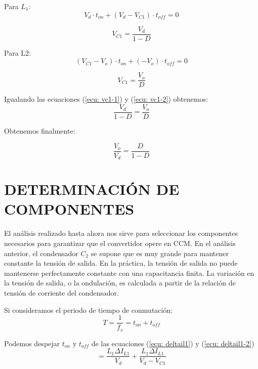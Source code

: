 \documentclass[conference]{IEEEtran}
\begin{document}
Para $L_1$:
\begin{equation}
    V_d\cdot t_{on}+(V_d-V_{C1})\cdot t_{off}=0
\end{equation}

\begin{equation}
    V_{C1}=\frac{V_d}{1-D}
    \label{ecu: vc1-1}
\end{equation}

Para L2:
\begin{equation}
    (V_{C1}-V_o)\cdot t_{on}+(-V_o)\cdot t_{off}=0
\end{equation}

\begin{equation}
    V_{C1}=\frac{V_o}{D}
    \label{ecu: vc1-2}
\end{equation}

Igualando las ecuaciones (\ref{ecu: vc1-1}) y (\ref{ecu: vc1-2}) obtenemos:
\begin{equation}
    \frac{V_d}{1-D}=\frac{V_o}{D}
\end{equation}

Obtenemos finalmente:

\begin{equation}
    \frac{V_o}{V_d}=\frac{D}{1-D}
    \label{ecu: fcn trans}
\end{equation}


\section{DETERMINACIÓN DE COMPONENTES}
El análisis realizado hasta ahora nos sirve para seleccionar los componentes necesarios para garantizar que el convertidor opere en CCM. En el análisis anterior, el condensador $C_2$ se supone que es muy grande para mantener constante la tensión de salida. En la práctica, la tensión de salida no puede mantenerse perfectamente constante con una capacitancia finita. La variación en la tensión de salida, o la ondulación, es calculada a partir de la relación de tensión de corriente del condensador.

Si consideramos el periodo de tiempo de conmutación:
\begin{equation}
    T=\frac{1}{f_s}=t_{on}+t_{off}
\end{equation}

Podemos despejar $t_{on}$ y $t_{off}$ de las ecuaciones (\ref{ecu: deltail1}) y (\ref{ecu: deltail1-2})
\begin{equation}
    =\frac{L_1\Delta I_{L1}}{V_d}+\frac{L_1\Delta I_{L1}}{V_d-V_{C1}}
\end{equation}
\end{document}
